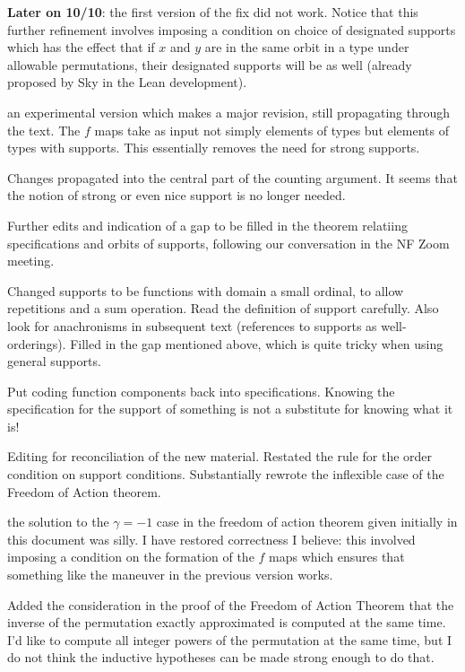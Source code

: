 \documentclass[112pt]{article}
\begin{document}
\begin{description}
{\bf Later on 10/10}:  the first version of the fix did not work.  Notice that this further refinement involves imposing a condition on choice of designated supports which has the effect that if $x$ and $y$ are in the same orbit in a type under allowable permutations, their designated supports will be as well (already proposed by Sky in the Lean development).

\item[11/7/2023:]  an experimental version which makes a major revision, still propagating through the text.  The $f$ maps take as input not
simply elements of types but elements of types with supports.  This essentially removes the need for strong supports.

\item[11/14/2023:]  Changes propagated into the central part of the counting argument.  It seems that the notion of strong or even nice support is no longer needed.

\item[11/14/2023 (after Zoom meeting):]  Further edits and indication of a gap to be filled in the theorem relatiing specifications and orbits of supports, following our conversation in the NF Zoom meeting.

\item[11/15/2023:]  Changed supports to be functions with domain a small ordinal, to allow repetitions and a sum operation.  Read the definition of support carefully.  Also look for anachronisms in subsequent text (references to supports as well-orderings).  Filled in the gap mentioned above, which is quite tricky when using general supports.

\item[11/15/2023, later:]  Put coding function components back into specifications.  Knowing the specification for the support of something is not a substitute for knowing what it is!

\item[11/16/2023:]  Editing for reconciliation of the new material.  Restated the rule for the order condition on support conditions.  Substantially rewrote
the inflexible case of the Freedom of Action theorem.

\item[11/16/2023:]  the solution to the $\gamma=-1$ case in the freedom of action theorem given initially in this document was silly.
I have restored correctness I believe:  this involved imposing a condition on the formation of the $f$ maps which ensures that something like the maneuver in the previous version works.

\item[11/20/2023:]  Added the consideration in the proof of the Freedom of Action Theorem that the inverse of the permutation exactly approximated is computed at the same time.  I'd like to compute all integer powers of the permutation at the same time, but I do not think the inductive hypotheses can be made strong enough to do that.

\end{description}
\end{document}
